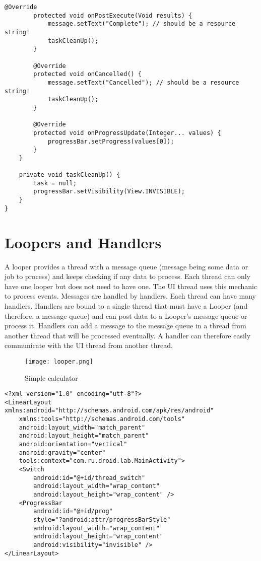 \begin{lstlisting}[style=A_Java, caption={Background task done with asynchronous task}, label={listing:asyncprog}]
        @Override
        protected void onPostExecute(Void results) {
            message.setText("Complete"); // should be a resource string!
            taskCleanUp();
        }

        @Override
        protected void onCancelled() {
            message.setText("Cancelled"); // should be a resource string!
            taskCleanUp();
        }

        @Override
        protected void onProgressUpdate(Integer... values) {
            progressBar.setProgress(values[0]);
        }
    }

    private void taskCleanUp() {
        task = null;
        progressBar.setVisibility(View.INVISIBLE);
    }
}
\end{lstlisting}

\section{Loopers and Handlers}
A looper provides a thread with a message queue (message being some data or job to process) and keeps checking if any data to process. Each thread can only have one looper but does not need to have one. The UI thread uses this mechanic to process events. Messages are handled by handlers. Each thread can have many handlers. Handlers are bound to a single thread that must have a Looper (and therefore, a message queue) and can post data to a Looper's message queue or process it. Handlers can add a message to the message queue in a thread from another thread that will be processed eventually. A handler can therefore easily communicate with the UI thread from another thread.

\begin{figure}[H]
\centering
\texttt{[image: looper.png]}
\caption{Simple calculator}
\label{fig:simcal}
\end{figure}

\begin{lstlisting}[style=A_XML,caption={Layout for handler program},label={listing:switchlayout}]
<?xml version="1.0" encoding="utf-8"?>
<LinearLayout xmlns:android="http://schemas.android.com/apk/res/android"
    xmlns:tools="http://schemas.android.com/tools"
    android:layout_width="match_parent"
    android:layout_height="match_parent"
    android:orientation="vertical"
    android:gravity="center"
    tools:context="com.ru.droid.lab.MainActivity">
    <Switch
        android:id="@+id/thread_switch"
        android:layout_width="wrap_content"
        android:layout_height="wrap_content" />
    <ProgressBar
        android:id="@+id/prog"
        style="?android:attr/progressBarStyle"
        android:layout_width="wrap_content"
        android:layout_height="wrap_content"
        android:visibility="invisible" />
</LinearLayout>
\end{lstlisting}

